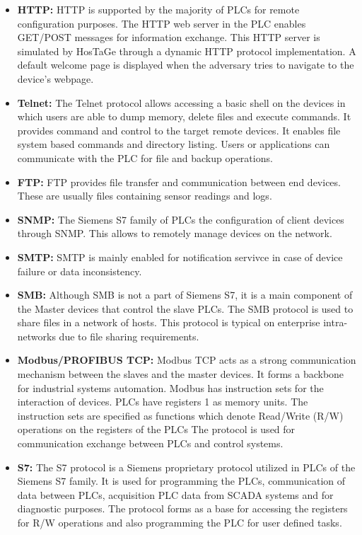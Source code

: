 \documentclass[article,msc=informatik,type=msc,colorback,accentcolor=tud9c]{tudthesis}
\begin{document}
	\begin{itemize}

	\item\textbf{HTTP:} HTTP is supported by the majority of \ac{PLC}s for remote configuration purposes. The HTTP web server in the \ac{PLC} enables GET/POST messages for information exchange. This \ac{HTTP} server is simulated by HosTaGe through a dynamic \ac{HTTP} protocol implementation. A default welcome page is displayed when the adversary tries to navigate to the device's webpage.

	\item\textbf{Telnet:} The Telnet protocol allows accessing a basic shell on the devices in which users are able to dump memory, delete files and execute commands. It provides command and control to the target remote devices. It enables file system based commands and directory listing. Users or applications can communicate with the \ac{PLC} for file and backup operations.

	\item\textbf{FTP:} \ac{FTP} provides file transfer and communication between end devices. These are usually files containing sensor readings and logs.

	\item\textbf{SNMP:} The Siemens S7 family of \ac{PLC}s the configuration of client devices through \ac{SNMP}. This allows to remotely manage devices on the network.

	\item\textbf{SMTP:} SMTP is mainly enabled for notification servivce in case of device failure or data inconsistency.

	\item\textbf{SMB:} Although SMB is not a part of Siemens S7,  it is a main component of the Master devices that control the slave \ac{PLC}s. The \ac{SMB} protocol is used to share files in a network of hosts. This protocol is typical on enterprise intra-networks due to file sharing requirements.

	\item\textbf{Modbus/PROFIBUS TCP:} Modbus TCP acts as a strong communication mechanism between the slaves and the master devices. It forms a backbone for industrial systems automation. Modbus has instruction sets for the interaction of devices. \ac{PLC}s have registers 1 as memory units. The instruction sets are specified as functions which denote Read/Write (R/W) operations on the registers of the \ac{PLC}s 
	The protocol is used for communication exchange between \ac{PLC}s and control systems.  
 
	\item\textbf{S7:} The \ac{S7} protocol is a Siemens proprietary protocol utilized in \ac{PLC}s of the Siemens S7 family. It is used for programming the \ac{PLC}s, communication of data between \ac{PLC}s, acquisition \ac{PLC} data from \ac{SCADA} systems and for diagnostic purposes. The protocol forms as a base for accessing the registers for R/W operations and also programming the \ac{PLC} for user defined tasks.

	\end{itemize}
	\vspace{5mm} 
\end{document}
